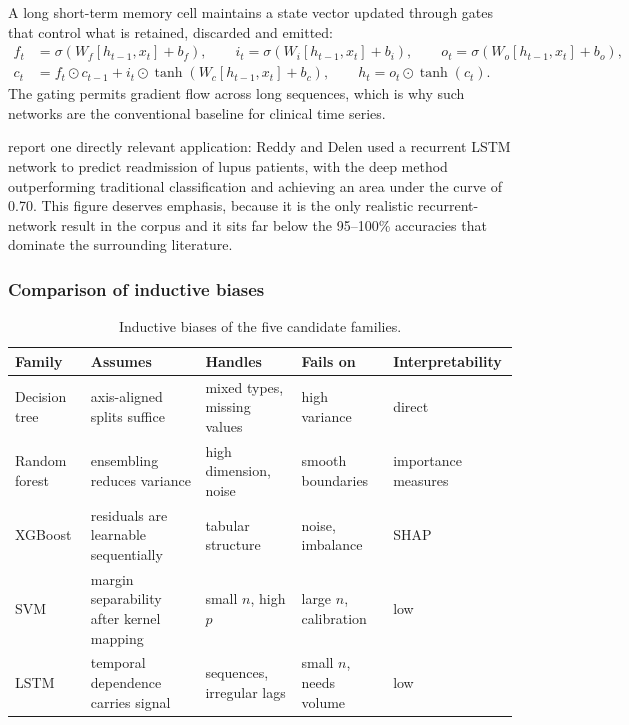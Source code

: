 \documentclass[12pt,a4paper,oneside]{report}
\begin{document}
A long short-term memory cell maintains a state vector updated through gates that control what is retained, discarded and emitted:
\begin{align}
  f_t &= \sigma(W_f[h_{t-1}, x_t] + b_f), \qquad
  i_t = \sigma(W_i[h_{t-1}, x_t] + b_i), \qquad
  o_t = \sigma(W_o[h_{t-1}, x_t] + b_o),\\
  c_t &= f_t \odot c_{t-1} + i_t \odot \tanh(W_c[h_{t-1}, x_t] + b_c),
  \qquad h_t = o_t \odot \tanh(c_t).
\end{align}
The gating permits gradient flow across long sequences, which is why such networks are the conventional baseline for clinical time series.

\Textcite{liu2025review} report one directly relevant application: Reddy and Delen used a recurrent LSTM network to predict readmission of lupus patients, with the deep method outperforming traditional classification and achieving an area under the curve of 0.70. This figure deserves emphasis, because it is the only realistic recurrent-network result in the corpus and it sits far below the 95--100\% accuracies that dominate the surrounding literature.

\subsubsection{Comparison of inductive biases}

\begin{table}[htbp]
\centering\footnotesize
\caption{Inductive biases of the five candidate families.}\label{tab:inductive-bias}
\begin{tabularx}{\textwidth}{@{}>{\raggedright\arraybackslash}p{2.3cm} >{\raggedright\arraybackslash}X >{\raggedright\arraybackslash}X >{\raggedright\arraybackslash}X >{\raggedright\arraybackslash}p{2.3cm}@{}}
\toprule
\textbf{Family} & \textbf{Assumes} & \textbf{Handles} & \textbf{Fails on} & \textbf{Interpretability} \\
\midrule
Decision tree & axis-aligned splits suffice & mixed types, missing values & high variance & direct \\
Random forest & ensembling reduces variance & high dimension, noise & smooth boundaries & importance measures \\
XGBoost & residuals are learnable sequentially & tabular structure & noise, imbalance & SHAP \\
SVM & margin separability after kernel mapping & small $n$, high $p$ & large $n$, calibration & low \\
LSTM & temporal dependence carries signal & sequences, irregular lags & small $n$, needs volume & low \\
\bottomrule
\end{tabularx}
\end{table}
\end{document}
